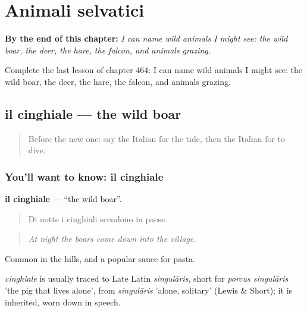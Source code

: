 
\chapter{Animali selvatici}
\label{ch:it-animali-selvatici}

\begin{chapteropening}
\textbf{By the end of this chapter:} \emph{I can name wild animals I might see: the wild boar, the deer, the hare, the falcon, and animals grazing.}

Complete the last lesson of chapter 464: I can name wild animals I might see: the wild boar, the deer, the hare, the falcon, and animals grazing.
\end{chapteropening}

\section[il cinghiale]{il cinghiale — the wild boar}

\label{lesson:IT-C464-cinghiale}



\begin{quote}
Before the new one: say the Italian for the tide, then the Italian for to dive.
\end{quote}

\subsection*{You'll want to know: il cinghiale}
\textbf{il cinghiale} — \textquotedblleft{}the wild boar\textquotedblright{}.

\begin{quote}
Di notte i cinghiali scendono in paese.
\end{quote}

\begin{quote}
\emph{At night the boars come down into the village.}
\end{quote}

Common in the hills, and a popular sauce for pasta.

\begin{cousinweb}
\emph{cinghiale} is usually traced to Late Latin \emph{singulāris}, short for \emph{porcus singulāris} 'the pig that lives alone', from \emph{singulāris} 'alone, solitary' (Lewis \& Short); it is inherited, worn down in speech.
\end{cousinweb}

